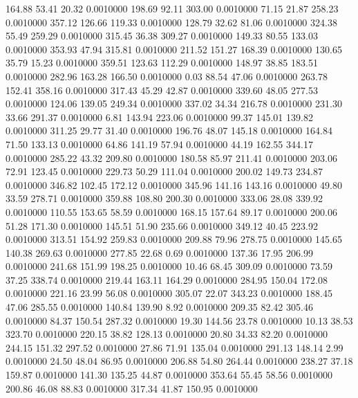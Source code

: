  164.88   53.41   20.32   0.0010000
 198.69   92.11  303.00   0.0010000
  71.15   21.87  258.23   0.0010000
 357.12  126.66  119.33   0.0010000
 128.79   32.62   81.06   0.0010000
 324.38   55.49  259.29   0.0010000
 315.45   36.38  309.27   0.0010000
 149.33   80.55  133.03   0.0010000
 353.93   47.94  315.81   0.0010000
 211.52  151.27  168.39   0.0010000
 130.65   35.79   15.23   0.0010000
 359.51  123.63  112.29   0.0010000
 148.97   38.85  183.51   0.0010000
 282.96  163.28  166.50   0.0010000
   0.03   88.54   47.06   0.0010000
 263.78  152.41  358.16   0.0010000
 317.43   45.29   42.87   0.0010000
 339.60   48.05  277.53   0.0010000
 124.06  139.05  249.34   0.0010000
 337.02   34.34  216.78   0.0010000
 231.30   33.66  291.37   0.0010000
   6.81  143.94  223.06   0.0010000
  99.37  145.01  139.82   0.0010000
 311.25   29.77   31.40   0.0010000
 196.76   48.07  145.18   0.0010000
 164.84   71.50  133.13   0.0010000
  64.86  141.19   57.94   0.0010000
  44.19  162.55  344.17   0.0010000
 285.22   43.32  209.80   0.0010000
 180.58   85.97  211.41   0.0010000
 203.06   72.91  123.45   0.0010000
 229.73   50.29  111.04   0.0010000
 200.02  149.73  234.87   0.0010000
 346.82  102.45  172.12   0.0010000
 345.96  141.16  143.16   0.0010000
  49.80   33.59  278.71   0.0010000
 359.88  108.80  200.30   0.0010000
 333.06   28.08  339.92   0.0010000
 110.55  153.65   58.59   0.0010000
 168.15  157.64   89.17   0.0010000
 200.06   51.28  171.30   0.0010000
 145.51   51.90  235.66   0.0010000
 349.12   40.45  223.92   0.0010000
 313.51  154.92  259.83   0.0010000
 209.88   79.96  278.75   0.0010000
 145.65  140.38  269.63   0.0010000
 277.85   22.68    0.69   0.0010000
 137.36   17.95  206.99   0.0010000
 241.68  151.99  198.25   0.0010000
  10.46   68.45  309.09   0.0010000
  73.59   37.25  338.74   0.0010000
 219.44  163.11  164.29   0.0010000
 284.95  150.04  172.08   0.0010000
 221.16   23.99   56.08   0.0010000
 305.07   22.07  343.23   0.0010000
 188.45   47.06  285.55   0.0010000
 140.84  139.90    8.92   0.0010000
 209.35   82.42  305.46   0.0010000
  84.37  150.54  287.32   0.0010000
  19.30  144.56   23.78   0.0010000
  10.13   38.53  323.70   0.0010000
 220.15   38.82  128.13   0.0010000
  20.80   34.33   82.20   0.0010000
 244.15  151.32  297.52   0.0010000
  27.86   71.91  135.04   0.0010000
 291.13  148.14    2.99   0.0010000
  24.50   48.04   86.95   0.0010000
 206.88   54.80  264.44   0.0010000
 238.27   37.18  159.87   0.0010000
 141.30  135.25   44.87   0.0010000
 353.64   55.45   58.56   0.0010000
 200.86   46.08   88.83   0.0010000
 317.34   41.87  150.95   0.0010000
